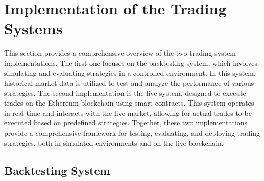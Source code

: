 \chapter{Implementation of the Trading Systems}
This section provides a comprehensive overview of the two trading system implementations. The first one focuses on the backtesting system, which involves simulating and evaluating strategies in a controlled environment. In this system, historical market data is utilized to test and analyze the performance of various strategies. The second implementation is the live system, designed to execute trades on the Ethereum blockchain using smart contracts. This system operates in real-time and interacts with the live market, allowing for actual trades to be executed based on predefined strategies. Together, these two implementations provide a comprehensive framework for testing, evaluating, and deploying trading strategies, both in simulated environments and on the live blockchain.

\section{Backtesting System}
\label{sec:backtesting-sys}

